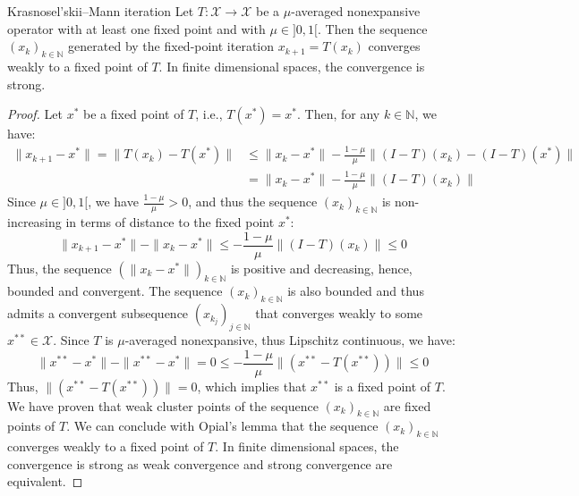 \begin{theorem}{Krasnosel'skii–Mann iteration \cite{bauschke2017convex}}
    Let $T: \mathcal{X} \to \mathcal{X}$ be a $\mu$-averaged nonexpansive operator with at least one fixed point and with $\mu \in ]0, 1[$.
    Then the sequence $(x_k)_{k \in \mathbb{N}}$ generated by the fixed-point iteration $x_{k+1} = T(x_k)$ converges weakly to a fixed point of $T$.
    In finite dimensional spaces, the convergence is strong.
\end{theorem}

\begin{proof}
    Let $x^*$ be a fixed point of $T$, i.e., $T(x^*) = x^*$. Then, for any $k \in \mathbb{N}$, we have:
    \begin{align*}
        \|x_{k+1} - x^*\| = \|T(x_k) - T(x^*)\| &\leq \|x_k - x^*\| - \frac{1 - \mu}{\mu} \|(I - T)(x_k) - (I - T)(x^*)\| \\
        &= \|x_k - x^*\| - \frac{1 - \mu}{\mu} \|(I - T)(x_k)\|
    \end{align*}
    Since $\mu \in ]0, 1[$, we have $\frac{1 - \mu}{\mu} > 0$, and thus the sequence $(x_k)_{k \in \mathbb{N}}$ is non-increasing in terms of distance to the fixed point $x^*$:
    \begin{equation*}
        \|x_{k+1} - x^*\| - \|x_k - x^*\| \leq - \frac{1 - \mu}{\mu} \|(I - T)(x_k)\| \leq 0
    \end{equation*}
    Thus, the sequence $(\|x_k - x^*\|)_{k \in \mathbb{N}}$ is positive and decreasing, hence, bounded and convergent.
    The sequence $(x_k)_{k \in \mathbb{N}}$ is also bounded and thus admits a convergent subsequence $(x_{k_j})_{j \in \mathbb{N}}$ that converges weakly to some $x^{**} \in \mathcal{X}$.
    Since $T$ is $\mu$-averaged nonexpansive, thus Lipschitz continuous, we have:
    \begin{equation*}
        \|x^{**} - x^*\| - \|x^{**} - x^*\| = 0 \leq - \frac{1 - \mu}{\mu} \|(x^{**} - T(x^{**}))\| \leq 0
    \end{equation*}
    Thus, $\|(x^{**} - T(x^{**}))\| = 0$, which implies that $x^{**}$ is a fixed point of $T$. We have proven that weak cluster points of the sequence $(x_k)_{k \in \mathbb{N}}$ are fixed points of $T$.
    We can conclude with Opial's lemma that the sequence $(x_k)_{k \in \mathbb{N}}$ converges weakly to a fixed point of $T$. In finite dimensional spaces, the convergence is strong as weak convergence and strong convergence are equivalent.
\end{proof}

